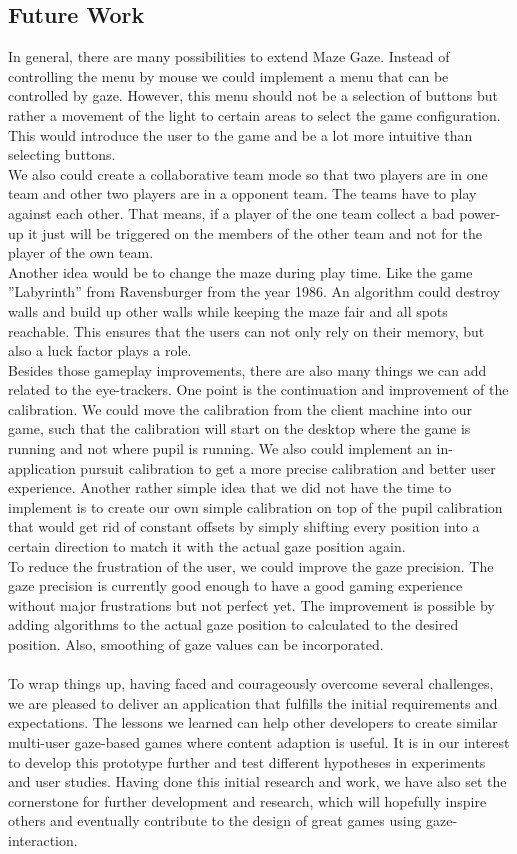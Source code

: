 \documentclass{sigchi}
\begin{document}
\subsection{Future Work}
In general, there are many possibilities to extend Maze Gaze. Instead of controlling the menu by mouse we could implement a menu that can be controlled by gaze. However, this menu should not be a selection of buttons but rather a movement of the light to certain areas to select the game configuration. This would introduce the user to the game and be a lot more intuitive than selecting buttons.\\ 
We also could create a collaborative team mode so that two players are in one team and other two players are in a opponent team. The teams have to play against each other. That means, if a player of the one team collect a bad power-up it just will be triggered on the members of the other team and not for the player of the own team.\\ 
Another idea would be to change the maze during play time. Like the game ''Labyrinth'' from Ravensburger from the year 1986. An algorithm could destroy walls and build up other walls while keeping the maze fair and all spots reachable. This ensures that the users can not only rely on their memory, but also a luck factor plays a role.\\
Besides those gameplay improvements, there are also many things we can add related to the eye-trackers. One point is the continuation and improvement of the calibration. We could move the calibration from the client machine into our game, such that the calibration will start on the desktop where the game is running and not where pupil is running. We also could implement an in-application pursuit calibration to get a more precise calibration and better user experience. Another rather simple idea that we did not have the time to implement is to create our own simple calibration on top of the pupil calibration that would get rid of constant offsets by simply shifting every position into a certain direction to match it with the actual gaze position again. \\ 
To reduce the frustration of the user, we could improve the gaze precision. The gaze precision is currently good enough to have a good gaming experience without major frustrations but not perfect yet. The improvement is possible by adding algorithms to the actual gaze position to calculated to the desired position. Also, smoothing of gaze values can be incorporated. \\
\\
To wrap things up, having faced and courageously overcome several challenges, we are pleased to deliver an application that fulfills the initial requirements and expectations. The lessons we learned can help other developers to create similar multi-user gaze-based games where content adaption is useful. It is in our interest to develop this prototype further and test different hypotheses in experiments and user studies. Having done this initial research and work, we have also set the cornerstone for further development and research, which will hopefully inspire others and eventually contribute to the design of great games using gaze-interaction.

\balance{}




\end{document}
